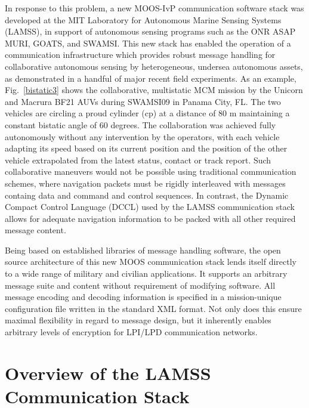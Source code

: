 \documentclass[11pt, letterpaper, oneside]{memoir}
\begin{document}
In response to this problem, a new MOOS-IvP communication software stack was developed at
the MIT Laboratory for Autonomous Marine Sensing Systems (LAMSS), in
support of autonomous sensing programs such as the ONR ASAP MURI,
GOATS, and SWAMSI. This new stack has enabled the operation of a communication
infrastructure which provides robust message handling for
collaborative autonomous sensing by heterogeneous, undersea autonomous
assets, as demonstrated in a handful of major recent field
experiments. As an example, Fig.~\ref{bistatic3} shows the
collaborative, multistatic MCM mission by the Unicorn and Macrura BF21
AUVs during SWAMSI09 in Panama City, FL. The two vehicles are circling
a proud cylinder (cp) at a distance of 80 m maintaining a constant
bistatic angle of 60 degrees. The collaboration was achieved fully
autonomously without any intervention by the operators, with each
vehicle adapting its speed based on its current position and the
position of the other vehicle extrapolated from the latest status,
contact or track report. Such collaborative maneuvers would not be
possible using traditional communication schemes, where navigation
packets must be rigidly interleaved with messages containg data and
command and control sequences. In contrast, the Dynamic Compact
Control Language (DCCL) used by the LAMSS communication
stack allows for adequate navigation information to be packed with all
other required message content.

Being based on established libraries of message handling software, the
open source architecture of this new MOOS communication stack lends
itself directly to a wide range of military and civilian
applications. It supports an arbitrary message suite and
content without requirement of modifying software. All message encoding and
decoding information is specified in a mission-unique configuration
file written in the standard XML format. Not only does this ensure
maximal flexibility in regard to message design, but it inherently
enables arbitrary levels of encryption for LPI/LPD communication
networks.

\section{Overview of the LAMSS Communication Stack}
\end{document}
